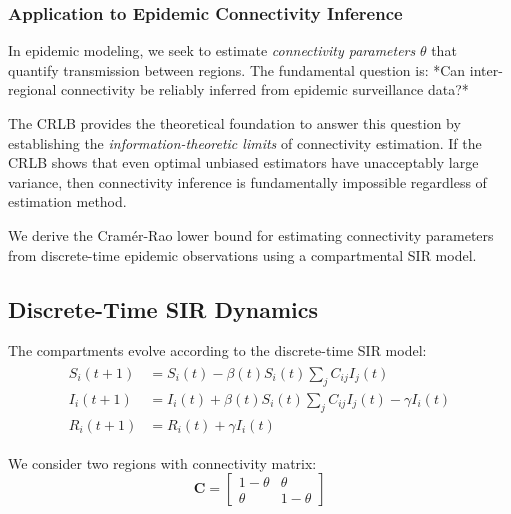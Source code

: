 \subsubsection{Application to Epidemic Connectivity Inference}

In epidemic modeling, we seek to estimate \emph{connectivity
parameters} $\theta$ that quantify transmission between regions. The
fundamental question is: *Can inter-regional connectivity be reliably
inferred from epidemic surveillance data?*

The CRLB provides the theoretical foundation to answer this question
by establishing the \emph{information-theoretic limits} of
connectivity estimation. If the CRLB shows that even optimal unbiased
estimators have unacceptably large variance, then connectivity
inference is fundamentally impossible regardless of estimation method.

We derive the Cramér-Rao lower bound for estimating connectivity
parameters from discrete-time epidemic observations using a
compartmental SIR model.

\subsection{Discrete-Time SIR Dynamics}

The compartments evolve according to the discrete-time SIR model:
\begin{align}\begin{split}\label{eq:sir}
S_i(t+1) &= S_i(t) - \beta(t) S_i(t) \sum_j C_{ij} I_j(t) \\
I_i(t+1) &= I_i(t) + \beta(t) S_i(t) \sum_j C_{ij} I_j(t) - \gamma I_i(t) \\
R_i(t+1) &= R_i(t) + \gamma I_i(t)
\end{split}\end{align}

We consider two regions with connectivity matrix:
\begin{equation}
\mathbf{C} = \begin{bmatrix} 1-\theta & \theta \\ \theta & 1-\theta \end{bmatrix}
\end{equation}


